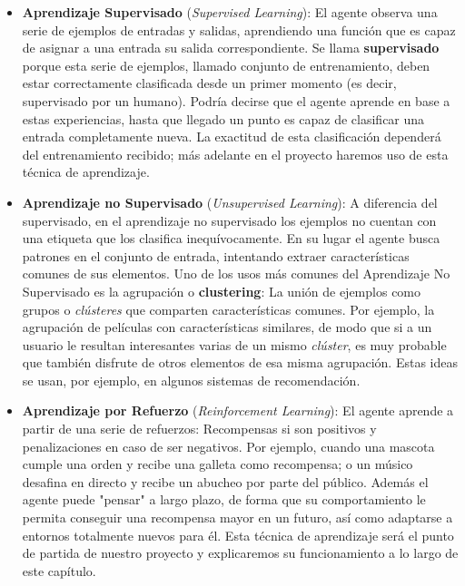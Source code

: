 \begin{itemize}
    \item \textbf{Aprendizaje Supervisado} (\textit{Supervised Learning}): El agente observa una serie de ejemplos de entradas y salidas, aprendiendo una función que es capaz de asignar a una entrada su salida correspondiente. Se llama \textbf{supervisado} porque esta serie de ejemplos, llamado conjunto de entrenamiento, deben estar correctamente clasificada desde un primer momento (es decir, supervisado por un humano). Podría decirse que el agente aprende en base a estas experiencias, hasta que llegado un punto es capaz de clasificar una entrada completamente nueva. La exactitud de esta clasificación dependerá del entrenamiento recibido; más adelante en el proyecto haremos uso de esta técnica de aprendizaje.
    \item \textbf{Aprendizaje no Supervisado} (\textit{Unsupervised Learning}): A diferencia del supervisado, en el aprendizaje no supervisado los ejemplos no cuentan con una etiqueta que los clasifica inequívocamente. En su lugar el agente busca patrones en el conjunto de entrada, intentando extraer características comunes de sus elementos. Uno de los usos más comunes del Aprendizaje No Supervisado es la agrupación o \textbf{clustering}: La unión de ejemplos como grupos o \textit{clústeres} que comparten características comunes. Por ejemplo, la agrupación de películas con características similares, de modo que si a un usuario le resultan interesantes varias de un mismo \textit{clúster}, es muy probable que también disfrute de otros elementos de esa misma agrupación. Estas ideas se usan, por ejemplo, en algunos sistemas de recomendación.   
    \item \textbf{Aprendizaje por Refuerzo} (\textit{Reinforcement Learning}): El agente aprende a partir de una serie de refuerzos: Recompensas si son positivos y penalizaciones en caso de ser negativos. Por ejemplo, cuando una mascota cumple una orden y recibe una galleta como recompensa; o un músico desafina en directo y recibe un abucheo por parte del público. Además el agente puede "pensar" a largo plazo, de forma que su comportamiento le permita conseguir una recompensa mayor en un futuro, así como adaptarse a entornos totalmente nuevos para él. Esta técnica de aprendizaje será el punto de partida de nuestro proyecto y explicaremos su funcionamiento a lo largo de este capítulo. 
\end{itemize}

